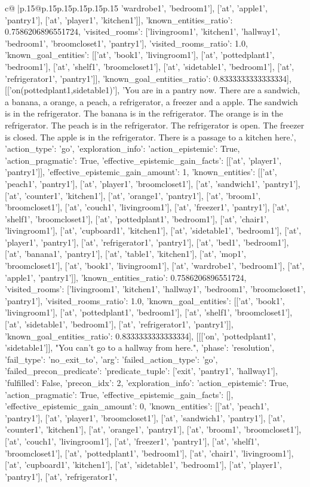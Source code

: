 \documentclass{article}
\begin{document}
{\begin{supertabular}{c@{$\;$}|p{.15\linewidth}@{}p{.15\linewidth}p{.15\linewidth}p{.15\linewidth}p{.15\linewidth}p{.15\linewidth}}
{{{'wardrobe1', 'bedroom1'], ['at', 'apple1', 'pantry1'], ['at', 'player1', 'kitchen1']], 'known_entities_ratio': 0.7586206896551724, 'visited_rooms': ['livingroom1', 'kitchen1', 'hallway1', 'bedroom1', 'broomcloset1', 'pantry1'], 'visited_rooms_ratio': 1.0, 'known_goal_entities': [['at', 'book1', 'livingroom1'], ['at', 'pottedplant1', 'bedroom1'], ['at', 'shelf1', 'broomcloset1'], ['at', 'sidetable1', 'bedroom1'], ['at', 'refrigerator1', 'pantry1']], 'known_goal_entities_ratio': 0.8333333333333334}}], [['on(pottedplant1,sidetable1)'], 'You are in a pantry now. There are a sandwich, a banana, a orange, a peach, a refrigerator, a freezer and a apple. The sandwich is in the refrigerator. The banana is in the refrigerator. The orange is in the refrigerator. The peach is in the refrigerator. The refrigerator is open. The freezer is closed. The apple is in the refrigerator. There is a passage to a kitchen here.', {'action_type': 'go', 'exploration_info': {'action_epistemic': True, 'action_pragmatic': True, 'effective_epistemic_gain_facts': [['at', 'player1', 'pantry1']], 'effective_epistemic_gain_amount': 1, 'known_entities': [['at', 'peach1', 'pantry1'], ['at', 'player1', 'broomcloset1'], ['at', 'sandwich1', 'pantry1'], ['at', 'counter1', 'kitchen1'], ['at', 'orange1', 'pantry1'], ['at', 'broom1', 'broomcloset1'], ['at', 'couch1', 'livingroom1'], ['at', 'freezer1', 'pantry1'], ['at', 'shelf1', 'broomcloset1'], ['at', 'pottedplant1', 'bedroom1'], ['at', 'chair1', 'livingroom1'], ['at', 'cupboard1', 'kitchen1'], ['at', 'sidetable1', 'bedroom1'], ['at', 'player1', 'pantry1'], ['at', 'refrigerator1', 'pantry1'], ['at', 'bed1', 'bedroom1'], ['at', 'banana1', 'pantry1'], ['at', 'table1', 'kitchen1'], ['at', 'mop1', 'broomcloset1'], ['at', 'book1', 'livingroom1'], ['at', 'wardrobe1', 'bedroom1'], ['at', 'apple1', 'pantry1']], 'known_entities_ratio': 0.7586206896551724, 'visited_rooms': ['livingroom1', 'kitchen1', 'hallway1', 'bedroom1', 'broomcloset1', 'pantry1'], 'visited_rooms_ratio': 1.0, 'known_goal_entities': [['at', 'book1', 'livingroom1'], ['at', 'pottedplant1', 'bedroom1'], ['at', 'shelf1', 'broomcloset1'], ['at', 'sidetable1', 'bedroom1'], ['at', 'refrigerator1', 'pantry1']], 'known_goal_entities_ratio': 0.8333333333333334}}], [[['on', 'pottedplant1', 'sidetable1']], "You can't go to a hallway from here.", {'phase': 'resolution', 'fail_type': 'no_exit_to', 'arg': {'failed_action_type': 'go', 'failed_precon_predicate': {'predicate_tuple': ['exit', 'pantry1', 'hallway1'], 'fulfilled': False, 'precon_idx': 2}}, 'exploration_info': {'action_epistemic': True, 'action_pragmatic': True, 'effective_epistemic_gain_facts': [], 'effective_epistemic_gain_amount': 0, 'known_entities': [['at', 'peach1', 'pantry1'], ['at', 'player1', 'broomcloset1'], ['at', 'sandwich1', 'pantry1'], ['at', 'counter1', 'kitchen1'], ['at', 'orange1', 'pantry1'], ['at', 'broom1', 'broomcloset1'], ['at', 'couch1', 'livingroom1'], ['at', 'freezer1', 'pantry1'], ['at', 'shelf1', 'broomcloset1'], ['at', 'pottedplant1', 'bedroom1'], ['at', 'chair1', 'livingroom1'], ['at', 'cupboard1', 'kitchen1'], ['at', 'sidetable1', 'bedroom1'], ['at', 'player1', 'pantry1'], ['at', 'refrigerator1', }}}
\end{supertabular}}
\end{document}
